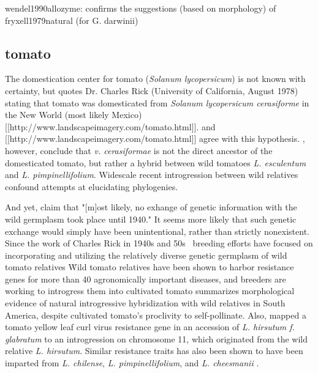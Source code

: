 \documentclass[11pt]{article}
\begin{document}
wendel1990allozyme:
confirms the suggestions (based on morphology) of fryxell1979natural (for G. darwinii)









\subsection*{tomato}

The domestication center for tomato (\emph{Solanum lycopersicum}) is not known with certainty, but \cite{sims1979history} quotes Dr. Charles Rick (University of California, August 1978) stating that tomato was domesticated from \emph{Solanum lycopersicum cerasiforme} in the New World (most likely Mexico) [[http://www.landscapeimagery.com/tomato.html]].
\cite{robertson2007genetic, bai2007domestication} and [[http://www.landscapeimagery.com/tomato.html]] agree with this hypothesis.
\cite{nesbitt2002comparative}, however, conclude that \emph{v. cerasiformae} is not the direct ancestor of the domesticated tomato, but rather a hybrid between wild tomatoes \emph{L. esculentum} and \emph{L. pimpinellifolium}.
Widescale recent introgression between wild relatives confound attempts at elucidating phylogenies.

And yet, \cite{bai2007domestication} claim that "[m]ost likely, no exhange of genetic information with the wild germplasm took place until 1940."
It seems more likely that such genetic exchange would simply have been unintentional, rather than strictly nonexistent.
Since the work of Charles Rick in 1940s and 50s \cite{rick1953novel}\, breeding efforts have focused on incorporating and utilizing the relatively diverse genetic germplasm of wild tomato relatives \cite{rick1988tomato, miller1990rflp, rick1982potential}\.
Wild tomato relatives have been shown to harbor resistance genes for more than 40 agronomically important diseases, and breeders are working to introgress them into cultivated tomato \cite{rick1995utilization}\.
\cite{rick1958role} summarizes morphological evidence of natural introgressive hybridization with wild relatives in South America, despite cultivated tomato's proclivity to self-pollinate.
Also, \cite{hanson2000mapping} mapped a tomato yellow leaf curl virus resistance gene in an accession of \emph{L. hirsutum f. glabratum} \cite{banerjee1990transfer} to an introgression on chromosome 11, which originated from the wild relative \emph{L. hirsutum}.
Similar resistance traits has also been shown to have been imparted from \emph{L. chilense}, \emph{L. pimpinellifolium}, and \emph{L. cheesmanii} \cite{hanson2000mapping}.
\end{document}
